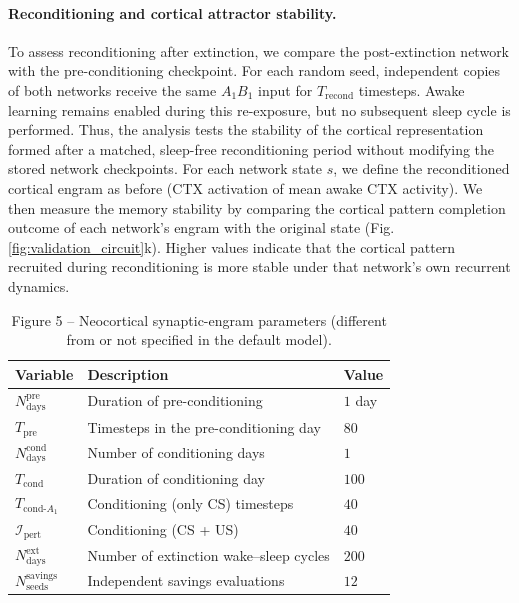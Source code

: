 \documentclass{article}
\begin{document}
\paragraph{Reconditioning and cortical attractor stability.}
To assess reconditioning after extinction, we compare the post-extinction network with the pre-conditioning checkpoint. For each random seed, independent copies of both networks receive the same $A_1B_1$ input for $T_{\textrm{recond}}$ timesteps. Awake learning remains enabled during this re-exposure, but no subsequent sleep cycle is performed. Thus, the analysis tests the stability of the cortical representation formed after a matched, sleep-free reconditioning period without modifying the stored network checkpoints. For each network state $s$, we define the reconditioned cortical engram as before (CTX activation of mean awake CTX activity). We then measure the memory stability by comparing the cortical pattern completion outcome of each network's engram with the original state (Fig. \ref{fig:validation_circuit}k). Higher values indicate that the cortical pattern recruited during reconditioning is more stable under that network's own recurrent dynamics.
\begin{table}[ht]
\centering
\caption{Figure 5 -- Neocortical synaptic-engram parameters (different from or not specified in the default model).}
\label{tab:synaptic_engrams_parameters}
\begin{tabular}{lll}
\toprule
\textbf{Variable} & \textbf{Description} & \textbf{Value} \\
\midrule
$N_{\textrm{days}}^{\textrm{pre}}$ & Duration of pre-conditioning & $1$ day \\
$T_{\textrm{pre}}$ & Timesteps in the pre-conditioning day & $80$ \\
\midrule
$N_{\textrm{days}}^{\textrm{cond}}$ & Number of conditioning days & $1$ \\
$T_{\textrm{cond}}$ & Duration of conditioning day & $100$ \\
$T_{\textrm{cond-$A_1$}}$ & Conditioning (only CS) timesteps & $40$  \\
$\mathcal{I}_{\textrm{pert}}$ & Conditioning (CS + US) & $40$ \\
\midrule
$N_{\textrm{days}}^{\textrm{ext}}$ & Number of extinction wake--sleep cycles & $200$ \\
$N_{\textrm{seeds}}^{\textrm{savings}}$ & Independent savings evaluations & $12$ \\
\bottomrule
\end{tabular}
\end{table}
\end{document}

